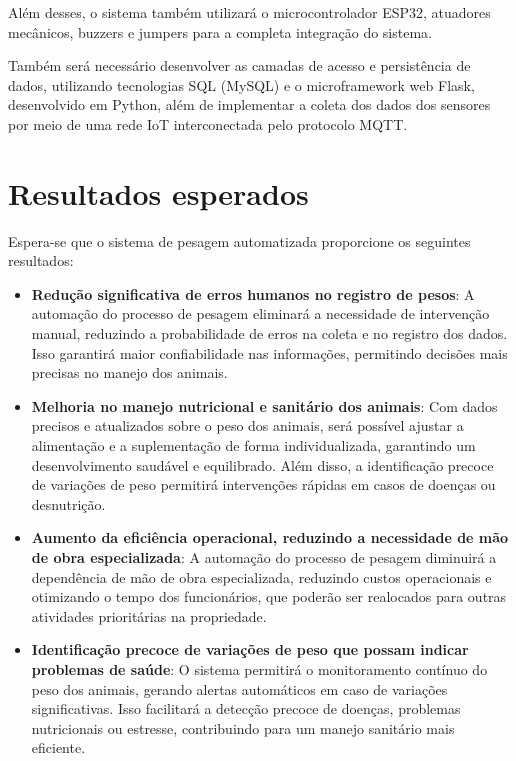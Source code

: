 \documentclass[11pt]{article}
\begin{document}
Além desses, o sistema também utilizará o microcontrolador ESP32, atuadores mecânicos, buzzers e jumpers para a completa integração do sistema.

Também será necessário desenvolver as camadas de acesso e persistência de dados, utilizando tecnologias SQL (MySQL) e o microframework web Flask, desenvolvido em Python, além de implementar a coleta dos dados dos sensores por meio de uma rede IoT interconectada pelo protocolo MQTT.

\section{Resultados esperados}
Espera-se que o sistema de pesagem automatizada proporcione os seguintes resultados:

\begin{itemize}
\item \textbf{Redução significativa de erros humanos no registro de pesos}:
A automação do processo de pesagem eliminará a necessidade de intervenção manual, reduzindo a probabilidade de erros na coleta e no registro dos dados. Isso garantirá maior confiabilidade nas informações, permitindo decisões mais precisas no manejo dos animais.

\item \textbf{Melhoria no manejo nutricional e sanitário dos animais}: 
Com dados precisos e atualizados sobre o peso dos animais, será possível ajustar a alimentação e a suplementação de forma individualizada, garantindo um desenvolvimento saudável e equilibrado. Além disso, a identificação precoce de variações de peso permitirá intervenções rápidas em casos de doenças ou desnutrição.

\item \textbf{Aumento da eficiência operacional, reduzindo a necessidade de mão de obra especializada}: 
A automação do processo de pesagem diminuirá a dependência de mão de obra especializada, reduzindo custos operacionais e otimizando o tempo dos funcionários, que poderão ser realocados para outras atividades prioritárias na propriedade.

\item \textbf{Identificação precoce de variações de peso que possam indicar problemas de saúde}: 
O sistema permitirá o monitoramento contínuo do peso dos animais, gerando alertas automáticos em caso de variações significativas. Isso facilitará a detecção precoce de doenças, problemas nutricionais ou estresse, contribuindo para um manejo sanitário mais eficiente.


\end{itemize}
\end{document}
